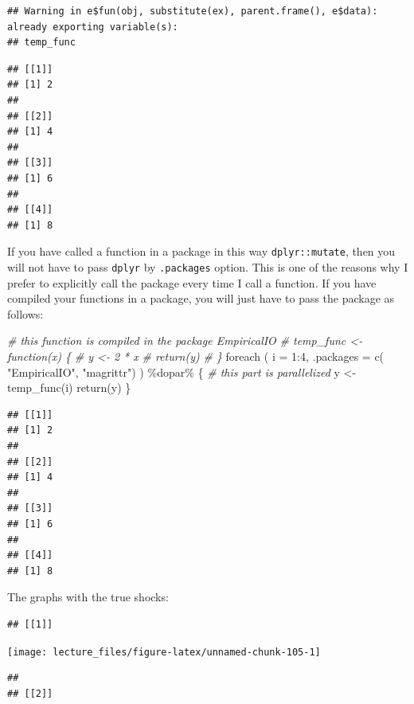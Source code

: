 \documentclass[
]{book}
\newenvironment{Shaded}{\begin{snugshade}}{\end{snugshade}}
\newcommand{\AttributeTok}[1]{\textcolor[rgb]{0.77,0.63,0.00}{#1}}
\newcommand{\CommentTok}[1]{\textcolor[rgb]{0.56,0.35,0.01}{\textit{#1}}}
\newcommand{\DecValTok}[1]{\textcolor[rgb]{0.00,0.00,0.81}{#1}}
\newcommand{\FunctionTok}[1]{\textcolor[rgb]{0.00,0.00,0.00}{#1}}
\newcommand{\NormalTok}[1]{#1}
\newcommand{\OtherTok}[1]{\textcolor[rgb]{0.56,0.35,0.01}{#1}}
\newcommand{\SpecialCharTok}[1]{\textcolor[rgb]{0.00,0.00,0.00}{#1}}
\newcommand{\StringTok}[1]{\textcolor[rgb]{0.31,0.60,0.02}{#1}}
\begin{document}
\begin{verbatim}
## Warning in e$fun(obj, substitute(ex), parent.frame(), e$data): already exporting variable(s):
## temp_func
\end{verbatim}

\begin{verbatim}
## [[1]]
## [1] 2
## 
## [[2]]
## [1] 4
## 
## [[3]]
## [1] 6
## 
## [[4]]
## [1] 8
\end{verbatim}

If you have called a function in a package in this way \texttt{dplyr::mutate}, then you will not have to pass \texttt{dplyr} by \texttt{.packages} option. This is one of the reasons why I prefer to explicitly call the package every time I call a function. If you have compiled your functions in a package, you will just have to pass the package as follows:

\begin{Shaded}
\begin{Highlighting}[]
\CommentTok{\# this function is compiled in the package EmpiricalIO}
\CommentTok{\# temp\_func \textless{}{-} function(x) \{}
\CommentTok{\#   y \textless{}{-} 2 * x}
\CommentTok{\#   return(y)}
\CommentTok{\# \}}
\FunctionTok{foreach}\NormalTok{ (}
  \AttributeTok{i =} \DecValTok{1}\SpecialCharTok{:}\DecValTok{4}\NormalTok{, }
  \AttributeTok{.packages =} \FunctionTok{c}\NormalTok{(}
    \StringTok{"EmpiricalIO"}\NormalTok{,}
    \StringTok{"magrittr"}\NormalTok{)}
\NormalTok{  ) }\SpecialCharTok{\%dopar\%}\NormalTok{ \{}
    \CommentTok{\# this part is parallelized}
\NormalTok{    y }\OtherTok{\textless{}{-}} \FunctionTok{temp\_func}\NormalTok{(i)}
    \FunctionTok{return}\NormalTok{(y)}
\NormalTok{\}}
\end{Highlighting}
\end{Shaded}

\begin{verbatim}
## [[1]]
## [1] 2
## 
## [[2]]
## [1] 4
## 
## [[3]]
## [1] 6
## 
## [[4]]
## [1] 8
\end{verbatim}

The graphs with the true shocks:

\begin{verbatim}
## [[1]]
\end{verbatim}

\begin{center}\texttt{[image: lecture\_files/figure-latex/unnamed-chunk-105-1]} \end{center}

\begin{verbatim}
## 
## [[2]]
\end{verbatim}
\end{document}
